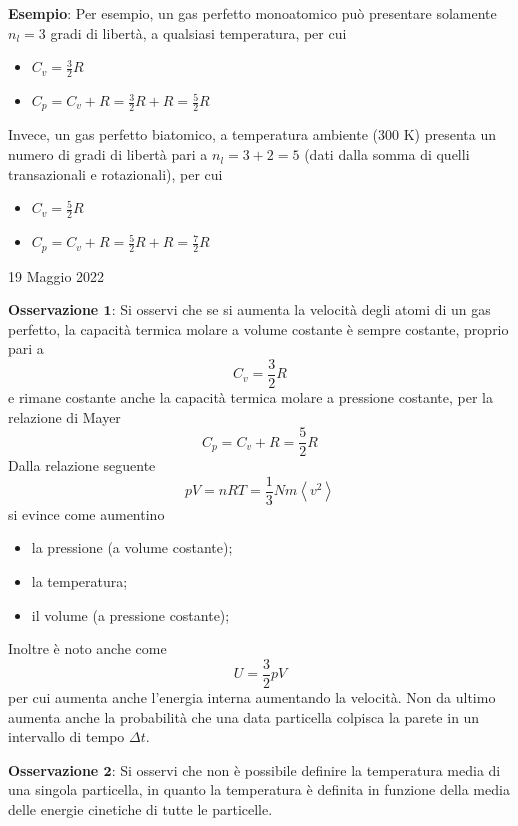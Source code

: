 \documentclass[a4paper]{extarticle}
\begin{document}
\vspace{1em}
\noindent
\textbf{Esempio}: Per esempio, un gas perfetto monoatomico può presentare solamente $n_l=3$ gradi di libertà, a qualsiasi temperatura, per cui
\begin{itemize}
  \item \(\displaystyle{C_v = \frac{3}{2} R}\)
  \item \(\displaystyle{C_p = C_v + R = \frac{3}{2} R + R = \frac{5}{2} R}\)
\end{itemize}
Invece, un gas perfetto biatomico, a temperatura ambiente ($300$ K) presenta un numero di gradi di libertà pari a $n_l=3+2=5$ (dati dalla somma di quelli transazionali e rotazionali), per cui
\begin{itemize}
  \item \(\displaystyle{C_v = \frac{5}{2} R}\)
  \item \(\displaystyle{C_p = C_v + R = \frac{5}{2} R + R = \frac{7}{2} R}\)
\end{itemize}

\newpage
\noindent
\begin{center}
  19 Maggio 2022
\end{center}
\textbf{Osservazione $\boldsymbol{1}$}: Si osservi che se si aumenta la velocità degli atomi di un gas perfetto, la capacità termica molare a volume costante è sempre costante, proprio pari a
\[C_v = \frac{3}{2} R\]
e rimane costante anche la capacità termica molare a pressione costante, per la relazione di Mayer
\[C_p = C_v + R = \frac{5}{2} R\]
Dalla relazione seguente
\[p V = nRT = \frac{1}{3} N m \left< v^2 \right>\]
si evince come aumentino
\begin{itemize}
  \item la pressione (a volume costante);
  \item la temperatura;
  \item il volume (a pressione costante);
\end{itemize}
Inoltre è noto anche come
\[U = \frac{3}{2} p V\]
per cui aumenta anche l'energia interna aumentando la velocità. Non da ultimo aumenta anche la probabilità che una data particella colpisca la parete in un intervallo di tempo $\Delta t$.

\vspace{1em}
\noindent
\textbf{Osservazione $\boldsymbol{2}$}: Si osservi che non è possibile definire la temperatura media di una singola particella, in quanto la temperatura è definita in funzione della media delle energie cinetiche di tutte le particelle.
\end{document}
